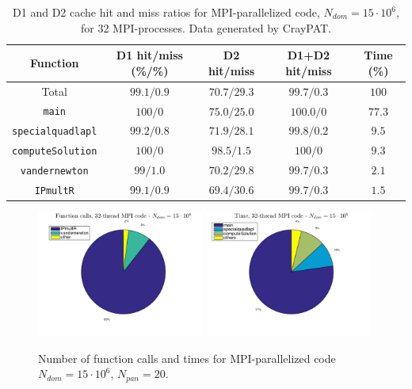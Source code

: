 \documentclass[a4paper,10pt]{article}
\def\code#1{\texttt{#1}}
\begin{document}
\begin{table}[ht]
\begin{center}
    \begin{tabular}{ c | c | c | c | c }
        Function & D1 hit/miss (\%/\%) & D2 hit/miss & D1+D2 hit/miss & Time (\%) \\ \hline
        Total & $99.1/0.9$ & $70.7/29.3$ & $99.7/0.3$ & $100$ \\ 
        \code{main} & $100/0$ & $75.0/25.0$ & $100.0/0$ & $77.3$ \\
        \code{specialquadlapl} & $99.2/0.8$ & $71.9/28.1$ & $99.8/0.2$ & $9.5$ \\
        \code{computeSolution} & $100/0$ & $98.5/1.5$ & $100/0$ & $9.3$ \\
        \code{vandernewton} & $99/1.0$ & $70.2/29.8$ & $99.7/0.3$ & $2.1$ \\
        \code{IPmultR} & $99.1/0.9$ & $69.4/30.6$ & $99.7/0.3$ & $1.5$
    \end{tabular}
    \caption{D1 and D2 cache hit and miss ratios for MPI-parallelized code, $N_{dom} = 15\cdot10^6$, for $32$ MPI-processes. Data generated by CrayPAT.}
    \label{tab:mpi_caches}
\end{center}
\end{table} 
\begin{figure}[ht]
    \begin{center}
        \includegraphics[width=0.49\textwidth]{Graphics/craypat_mpi_threads32_calls_pie.png}
        \includegraphics[width=0.49\textwidth]{Graphics/craypat_mpi_threads32_time_pie.png}
    \end{center}
    \caption{Number of function calls and times for MPI-parallelized code $N_{dom} = 15\cdot10^6$, $N_{pan} = 20$.}
    \label{fig:mpi_pie}
\end{figure}
\end{document}
